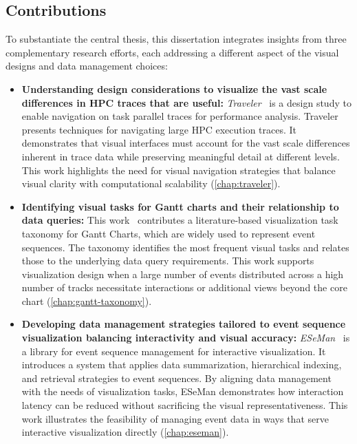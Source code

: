 \begin{refsection}
\section{Contributions}
\label{sec:contribution}
To substantiate the central thesis, this dissertation integrates insights from three complementary research efforts, each addressing a different aspect of the visual designs and data management choices:

\begin{itemize}
    \item \textbf{Understanding design considerations to visualize the vast scale differences in HPC traces that are useful:} \textit{Traveler}~\cite{sakin2022traveler} is a design study to enable navigation on task parallel traces for performance analysis. Traveler presents techniques for navigating large HPC execution traces. It demonstrates that visual interfaces must account for the vast scale differences inherent in trace data while preserving meaningful detail at different levels. This work highlights the need for visual navigation strategies that balance visual clarity with computational scalability (\autoref{chap:traveler}).
    
    \item \textbf{Identifying visual tasks for Gantt charts and their relationship to data queries:} This work~\cite{sakin2024gantttaxonomy} contributes a literature-based visualization task taxonomy for Gantt Charts, which are widely used to represent event sequences. The taxonomy identifies the most frequent visual tasks and relates those to the underlying data query requirements. This work supports visualization design when a large number of events distributed across a high number of tracks necessitate interactions or additional views beyond the core chart (\autoref{chap:gantt-taxonomy}).
    
    \item \textbf{Developing data management strategies tailored to event sequence visualization balancing interactivity and visual accuracy:} \textit{ESeMan}~\cite{sakin2025managing} is a library for event sequence management for interactive visualization. It introduces a system that applies data summarization, hierarchical indexing, and retrieval strategies to event sequences. By aligning data management with the needs of visualization tasks, ESeMan demonstrates how interaction latency can be reduced without sacrificing the visual representativeness. This work illustrates the feasibility of managing event data in ways that serve interactive visualization directly (\autoref{chap:eseman}).
\end{itemize}


\end{refsection}
